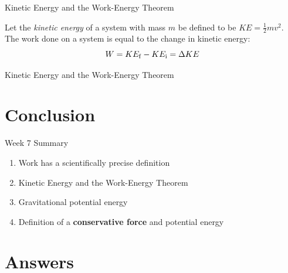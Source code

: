 \documentclass{beamer}
\begin{document}
\begin{frame}{Kinetic Energy and the Work-Energy Theorem}
\begin{tcolorbox}[colback=white,colframe=red!40!blue,title=The Work-Energy Theorem]
\small
\alert{
Let the \textit{kinetic energy} of a system with mass $m$ be defined to be $KE = \frac{1}{2}mv^2$.  The work done on a system is equal to the change in kinetic energy:
\begin{equation}
W = KE_{\rm f} - KE_{\rm i} = \Delta KE
\end{equation}
}
\end{tcolorbox}
\end{frame}

\begin{frame}{Kinetic Energy and the Work-Energy Theorem}
\end{frame}

\section{Conclusion}

\begin{frame}{Week 7 Summary}
\begin{enumerate}
\item \alert{Work} has a scientifically precise definition
\item Kinetic Energy and the \alert{Work-Energy Theorem}
\item Gravitational potential energy
\item Definition of a \textbf{conservative force} and potential energy
\end{enumerate}
\end{frame}

\section{Answers}
\end{document}
